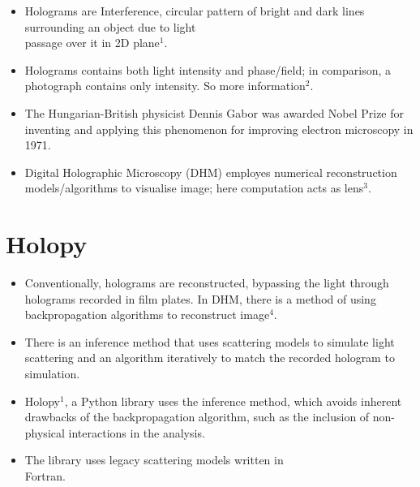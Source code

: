 \documentclass[a0paper,fleqn]{betterposter}
\begin{document}
{\begin{itemize}
    
    
    \item Holograms are Interference, circular pattern of bright and dark lines surrounding an object due to light \\passage over it in 2D plane$^{\text{1}}$.
    
    \item Holograms contains both light intensity and phase/field; in comparison, a photograph contains only intensity. So more information$^{\text{2}}$.
    
    \item  The Hungarian-British physicist Dennis Gabor was awarded Nobel Prize for inventing and applying this phenomenon for improving electron microscopy in 1971.
    
    \item Digital Holographic Microscopy (DHM) employes numerical reconstruction models/algorithms to visualise image; here computation acts as lens$^{\text{3}}$.
    
\end{itemize}

\section{Holopy}

\begin{itemize}
\item Conventionally, holograms are reconstructed, bypassing the light through holograms recorded in film plates. In DHM, there is a method of using backpropagation algorithms to reconstruct image$^{\text{4}}$.

\item There is an inference method that uses scattering models to simulate light scattering and an algorithm iteratively to match the recorded hologram to simulation.

\item Holopy$^{\text{1}}$, a Python library uses the inference method, which avoids inherent drawbacks of the backpropagation algorithm, such as the inclusion of non-physical interactions in the analysis.

\item The library uses legacy scattering models written in \\ Fortran.

\end{itemize}



}
\end{document}
